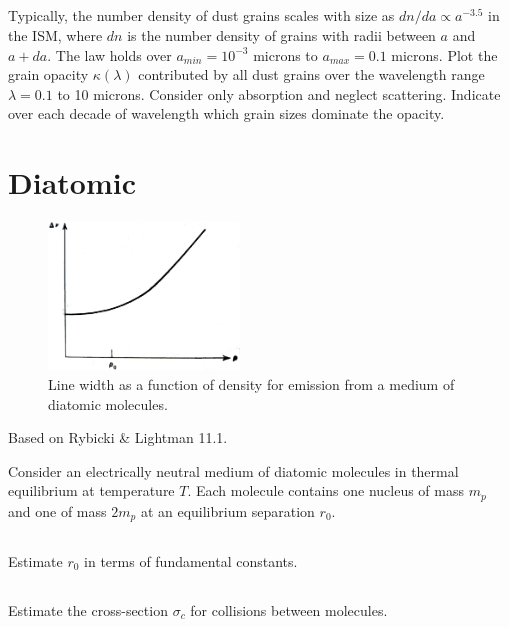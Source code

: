 \documentclass[11pt]{article}
\begin{document}
\subsection{}
Typically, the number density of dust grains scales with size as $dn/da\propto a^{-3.5}$ in
the ISM, where $dn$ is the number density of grains with radii between $a$ and $a+da$.  The
law holds over $a_{min}=10^{-3}$ microns to $a_{max}=0.1$ microns.  Plot the grain opacity
$\kappa(\lambda)$ contributed by all dust grains over the wavelength range $\lambda=0.1$ to
10 microns.  Consider only absorption and neglect scattering.  Indicate over each decade of
wavelength which grain sizes dominate the opacity.


\section{Diatomic}

\begin{figure}[!ht]\centering
\includegraphics[width=2in]{ps11_linewidth.png}
\caption{
Line width as a function of density for emission from a medium of diatomic molecules.
}\label{fig:linewidth}
\end{figure}

Based on Rybicki \& Lightman 11.1.

Consider an electrically neutral medium of diatomic molecules in thermal equilibrium at
temperature $T$.  Each molecule contains one nucleus of mass $m_p$ and one of mass $2m_p$
at an equilibrium separation $r_0$.

\subsection{}
Estimate $r_0$ in terms of fundamental constants.

\subsection{}
Estimate the cross-section $\sigma_c$ for collisions between molecules.

\subsection{}
\end{document}
